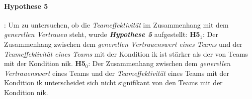 \documentclass[a4paper,11pt]{article}%
\renewcommand{\\}{\vspace*{0.5\baselineskip} \newline}
\begin{document}
\paragraph{Hypothese 5}:
Um zu untersuchen, ob die \textit{Teameffektivität} im Zusammenhang mit dem \textit{generellen Vertrauen} steht, wurde \textbf{\textit{Hypothese 5}} aufgestellt:\\
\textbf{H5$_{1}$}: Der Zusammenhang zwischen dem \textit{generellen Vertrauenswert eines Teams} und der \textit{Teameffektivität eines Teams} mit der Kondition \ac{ik} ist stärker als der von Teams mit der Kondition \ac{nik}. \newline
\textbf{H5$_{0}$}: Der Zusammenhang zwischen dem \textit{generellen Vertrauenswert} eines Teams und der \textit{Teameffektivität} eines Teams mit der Kondition \ac{ik} unterscheidet sich nicht signifikant von den Teams mit der Kondition \ac{nik}. \\
%
%
%


\end{document}
